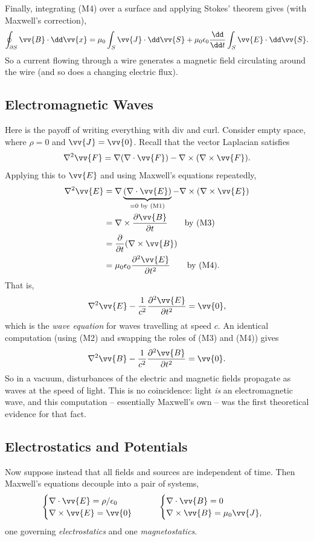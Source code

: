 Finally, integrating (M4) over a surface and applying Stokes' theorem gives  (with Maxwell's correction),
$$
\oint_{\partial S} \vv{B} \cdot \dd \vv{x} = \mu_0 \int_S \vv{J} \cdot \dd \vv{S} + \mu_0 \epsilon_0 \frac{\dd}{\dd t}\int_S \vv{E} \cdot \dd \vv{S}.
$$
So a current flowing through a wire generates a magnetic field circulating around the wire (and so does a changing electric flux).

\subsection{Electromagnetic Waves}

Here is the payoff of writing everything with div and curl. Consider empty space, where $\rho = 0$ and $\vv{J} = \vv{0}$. Recall that the vector Laplacian satisfies
$$
\nabla^2 \vv{F} = \nabla (\nabla \cdot \vv{F}) - \nabla \times (\nabla \times \vv{F}).
$$
Applying this to $\vv{E}$ and using Maxwell's equations repeatedly,
\begin{align*}
	\nabla^2 \vv{E} &= \nabla \underbrace{(\nabla \cdot \vv{E})}_{= 0 \text{ by (M1)}} - \nabla \times (\nabla \times \vv{E}) \\
	&= \nabla \times \frac{\partial \vv{B}}{\partial t} \quad \quad \text{by (M3)}\\
	&= \frac{\partial}{\partial t} (\nabla \times \vv{B}) \\
	&= \mu_0 \epsilon_0 \frac{\partial^2 \vv{E}}{\partial t^2} \quad \quad \text{by (M4)}.
\end{align*}
That is,
$$
\nabla^2 \vv{E} - \frac{1}{c^2} \frac{\partial^2 \vv{E}}{\partial t^2} = \vv{0},
$$
which is the \emph{wave equation} for waves travelling at speed $c$. An identical computation (using (M2) and swapping the roles of (M3) and (M4)) gives
$$
\nabla^2 \vv{B} - \frac{1}{c^2}\frac{\partial^2 \vv{B}}{\partial t^2} = \vv{0}.
$$
So in a vacuum, disturbances of the electric and magnetic fields propagate as waves at the speed of light. This is no coincidence: light \emph{is} an electromagnetic wave, and this computation -- essentially Maxwell's own -- was the first theoretical evidence for that fact.

\subsection{Electrostatics and Potentials}

Now suppose instead that all fields and sources are independent of time. Then Maxwell's equations decouple into a pair of systems,
$$
\begin{cases}
	\nabla \cdot \vv{E} = \rho/\epsilon_0 \\
	\nabla \times \vv{E} = \vv{0}
\end{cases}
\quad \quad
\begin{cases}
	\nabla \cdot \vv{B} = 0\\
	\nabla \times \vv{B} = \mu_0 \vv{J},
\end{cases}
$$
one governing \emph{electrostatics} and one \emph{magnetostatics}.


